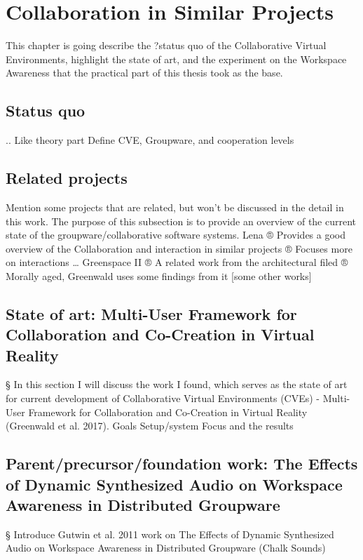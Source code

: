 \chapter{Collaboration in Similar Projects}


This chapter is going describe the ?status quo of the Collaborative Virtual Environments, highlight the state of art, and the experiment on the Workspace Awareness that the practical part of this thesis took as the base.

\section{Status quo}
.. Like theory part
Define CVE, Groupware, and cooperation levels

\section{Related projects}
Mention some projects that are related, but won't be discussed in the detail in this work. The purpose of this subsection is to provide an overview of the current state of the groupware/collaborative software systems.
Lena
® Provides a good overview of the Collaboration and interaction in similar projects
® Focuses more on interactions …
Greenspace II
® A related work from the architectural filed
® Morally aged, Greenwald uses some findings from it
[some other works]

\section{State of art: Multi-User Framework for Collaboration and Co-Creation in Virtual Reality}
§ In this section I will discuss the work I found, which serves as the state of art for current development of Collaborative Virtual Environments (CVEs) - Multi-User Framework for Collaboration and Co-Creation in Virtual Reality (Greenwald et al. 2017).
Goals
Setup/system
Focus and the results

\section{Parent/precursor/foundation work: The Effects of Dynamic Synthesized Audio on Workspace Awareness in Distributed Groupware}
§ Introduce Gutwin et al. 2011 work on The Effects of Dynamic Synthesized Audio on Workspace Awareness in Distributed Groupware (Chalk Sounds)


